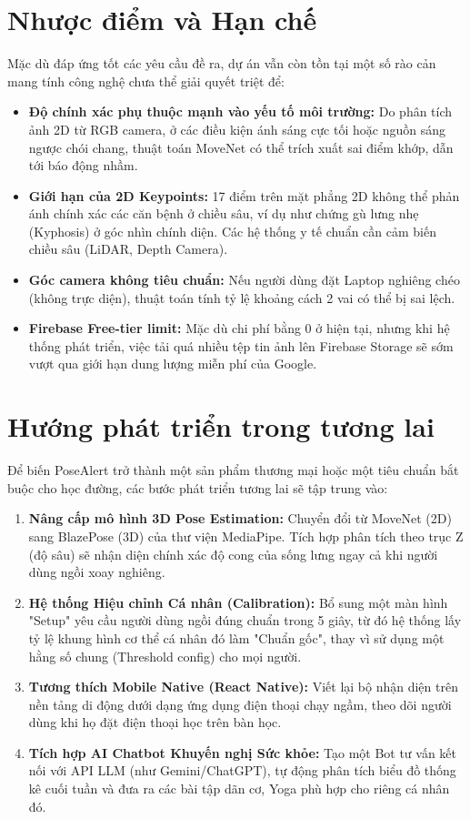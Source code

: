 \documentclass[12pt,a4paper]{report}
\begin{document}
\section{Nhược điểm và Hạn chế}
Mặc dù đáp ứng tốt các yêu cầu đề ra, dự án vẫn còn tồn tại một số rào cản mang tính công nghệ chưa thể giải quyết triệt để:
\begin{itemize}
    \item \textbf{Độ chính xác phụ thuộc mạnh vào yếu tố môi trường:} Do phân tích ảnh 2D từ RGB camera, ở các điều kiện ánh sáng cực tối hoặc nguồn sáng ngược chói chang, thuật toán MoveNet có thể trích xuất sai điểm khớp, dẫn tới báo động nhầm.
    \item \textbf{Giới hạn của 2D Keypoints:} 17 điểm trên mặt phẳng 2D không thể phản ánh chính xác các căn bệnh ở chiều sâu, ví dụ như chứng gù lưng nhẹ (Kyphosis) ở góc nhìn chính diện. Các hệ thống y tế chuẩn cần cảm biến chiều sâu (LiDAR, Depth Camera).
    \item \textbf{Góc camera không tiêu chuẩn:} Nếu người dùng đặt Laptop nghiêng chéo (không trực diện), thuật toán tính tỷ lệ khoảng cách 2 vai có thể bị sai lệch.
    \item \textbf{Firebase Free-tier limit:} Mặc dù chi phí bằng 0 ở hiện tại, nhưng khi hệ thống phát triển, việc tải quá nhiều tệp tin ảnh lên Firebase Storage sẽ sớm vượt qua giới hạn dung lượng miễn phí của Google.
\end{itemize}

\section{Hướng phát triển trong tương lai}
Để biến PoseAlert trở thành một sản phẩm thương mại hoặc một tiêu chuẩn bắt buộc cho học đường, các bước phát triển tương lai sẽ tập trung vào:
\begin{enumerate}
    \item \textbf{Nâng cấp mô hình 3D Pose Estimation:} Chuyển đổi từ MoveNet (2D) sang BlazePose (3D) của thư viện MediaPipe. Tích hợp phân tích theo trục Z (độ sâu) sẽ nhận diện chính xác độ cong của sống lưng ngay cả khi người dùng ngồi xoay nghiêng.
    \item \textbf{Hệ thống Hiệu chỉnh Cá nhân (Calibration):} Bổ sung một màn hình "Setup" yêu cầu người dùng ngồi đúng chuẩn trong 5 giây, từ đó hệ thống lấy tỷ lệ khung hình cơ thể cá nhân đó làm "Chuẩn gốc", thay vì sử dụng một hằng số chung (Threshold config) cho mọi người.
    \item \textbf{Tương thích Mobile Native (React Native):} Viết lại bộ nhận diện trên nền tảng di động dưới dạng ứng dụng điện thoại chạy ngầm, theo dõi người dùng khi họ đặt điện thoại học trên bàn học.
    \item \textbf{Tích hợp AI Chatbot Khuyến nghị Sức khỏe:} Tạo một Bot tư vấn kết nối với API LLM (như Gemini/ChatGPT), tự động phân tích biểu đồ thống kê cuối tuần và đưa ra các bài tập dãn cơ, Yoga phù hợp cho riêng cá nhân đó.
\end{enumerate}
\end{document}
